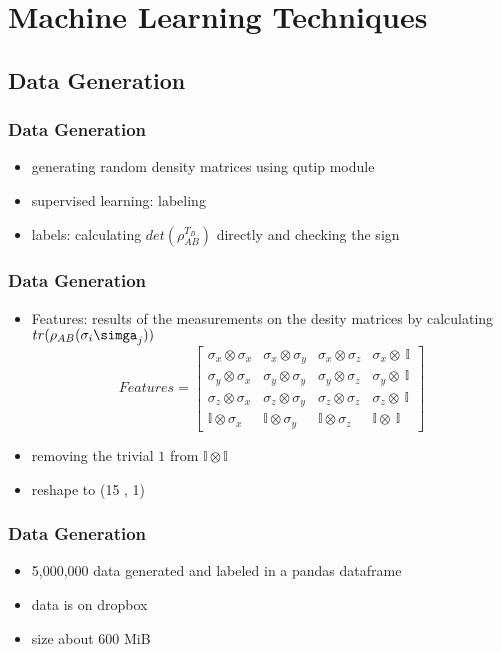 \documentclass[11pt]{beamer}
\begin{document}
\section{Machine Learning Techniques}

\subsection{Data Generation}
\begin{frame}
\frametitle{Data Generation}

\begin{itemize}
 \item generating random density matrices using qutip module
 \item supervised learning: labeling
 \item labels: calculating $det(\rho_{AB}^{T_B})$ directly and checking the sign
 
 
\end{itemize}

\end{frame}
\begin{frame}
\frametitle{Data Generation}

\begin{itemize}
\item Features: results of the measurements on the desity matrices by calculating $tr(\rho_{AB} (\sigma_i \simga_j))$ 
  \[
   Features=
  \left[ {\begin{array}{cccc}
\sigma_x\otimes\sigma_x & \sigma_x\otimes\sigma_y & \sigma_x\otimes\sigma_z & \sigma_x\otimes\ \mathbb{I} 
\\ \sigma_y\otimes\sigma_x & \sigma_y\otimes\sigma_y & \sigma_y\otimes\sigma_z & \sigma_y\otimes\ \mathbb{I}
\\ \sigma_z\otimes\sigma_x & \sigma_z\otimes\sigma_y & \sigma_z\otimes\sigma_z & \sigma_z\otimes\ \mathbb{I}
\\ \mathbb{I}\otimes\sigma_x & \mathbb{I}\otimes\sigma_y & \mathbb{I}\otimes\sigma_z & \mathbb{I}\otimes\ \mathbb{I}
  \end{array} } \right]
\]

\item removing the trivial $1$ from $ \mathbb{I} \otimes \mathbb{I} $

\item reshape to (15 , 1)
\end{itemize}

\end{frame}
\begin{frame}
\frametitle{Data Generation}

\begin{itemize}
 \item 5,000,000 data generated and labeled in a pandas dataframe
 \item data is on dropbox
 \item size about 600 MiB
\end{itemize}

\end{frame}
\end{document}
